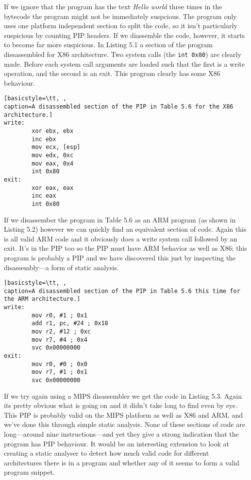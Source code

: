 \documentclass[10pt,]{book}
\begin{document}
If we ignore that the program has the text \emph{Hello world} three
times in the bytecode the program might not be immediately suspcious.
The program only uses one platform independent section to split the
code, so it isn't particularly suspicious by counting PIP headers. If we
diassemble the code, however, it starts to become far more suspicious.
In Listing 5.1 a section of the program dissassembled for X86
architecture. Two system calls (the \lstinline!int 0x80!) are clearly
made\autocite{Kerrisk:vo}. Before each system call arguments are loaded
such that the first is a write operation, and the second is an exit.
This program clearly has some X86 behaviour.

\begin{lstlisting}[basicstyle=\tt, ,
caption=A disassembled section of the PIP in Table 5.6 for the X86 architecture.]
write:
        xor ebx, ebx
        inc ebx
        mov ecx, [esp]
        mov edx, 0xc
        mov eax, 0x4
        int 0x80
exit:
        xor eax, eax
        inc eax
        int 0x80
\end{lstlisting}
If we disassember the program in Table 5.6 as an ARM program (as shown
in Listing 5.2) however we can quickly find an equivalent section of
code. Again this is all valid ARM code and it obviously does a write
system call followed by an exit. It's in the PIP too so the PIP must
have ARM behavior as well as X86; this program is probably a PIP and we
have discovered this just by inspecting the disassembly---a form of
static analysis.

\begin{lstlisting}[basicstyle=\tt, ,
caption=A disassembled section of the PIP in Table 5.6 this time for the ARM architecture.]
write:
        mov r0, #1 ; 0x1
        add r1, pc, #24 ; 0x18
        mov r2, #12 ; 0xc
        mov r7, #4 ; 0x4
        svc 0x00000000
exit:
        mov r0, #0 ; 0x0
        mov r7, #1 ; 0x1
        svc 0x00000000
\end{lstlisting}
If we try again using a MIPS disassembler we get the code in Listing
5.3. Again its pretty obvious what is going on and it didn't take long
to find even by eye. This PIP is probably valid on the MIPS platform as
well as X86 and ARM, and we've done this through simple static analysis.
None of these sections of code are long---around nine instructions---and
yet they give a strong indication that the program has PIP behaviour. It
would be an interesting extension to look at creating a static analyser
to detect how much valid code for different architectures there is in a
program and whether any of it seems to form a valid program snippet.
\end{document}
